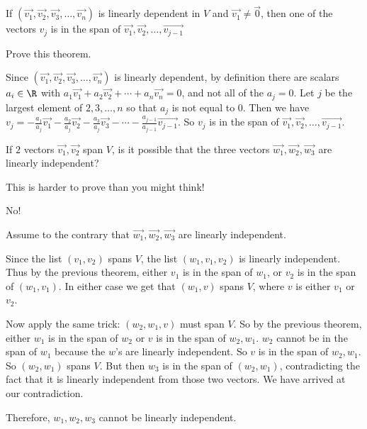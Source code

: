 \documentclass{ximera}
\begin{document}
 \begin{theorem}
 	If $(\vec{v_1},\vec{v_2},\vec{v_3}, \ldots, \vec{v_n})$ is linearly dependent in $V$ and $\vec{v_1} \neq \vec{0}$, then one of the vectors $v_j$ is in the 
 	span of $\vec{v_1},\vec{v_2},\ldots,\vec{v_{j-1}}$
 \end{theorem}
 
Prove this theorem.

\begin{free-response}
 	Since $(\vec{v_1},\vec{v_2},\vec{v_3}, \ldots, \vec{v_n})$ is linearly dependent, by definition there are scalars $a_i \in \R$ with 
 	$a_1\vec{v_1}+a_2\vec{v_2}+ \cdots +a_n\vec{v_n} = 0$, and not all of the $a_j =0$.  Let $j$ be the largest element of ${2,3,\ldots,n}$ so that $a_j$ is not equal to $0$.
 	Then we have 
 	$v_j = -\frac{a_1}{a_j}\vec{v_1}-\frac{a_2}{a_j}\vec{v_2} -\frac{a_3}{a_j}\vec{v_3} - \cdots -\frac{a_{j-1}}{a_{j-1}}\vec{v_{j-1}}$.
 	So $v_j$ is in the span of $\vec{v_1},\vec{v_2},\ldots,\vec{v_{j-1}}$.
 \end{free-response}
 
 
 	If $2$ vectors $\vec{v_1},\vec{v_2}$ span $V$, is it possible that the three vectors $\vec{w_1},\vec{w_2},\vec{w_3}$ are linearly independent?
 	
 	\begin{warning}
 		This is harder to prove than you might think!
 	\end{warning}
\begin{free-response}
	No!
	
	Assume to the contrary that $\vec{w_1},\vec{w_2},\vec{w_3}$ are linearly independent.
	
	Since the list $(v_1,v_2)$ spans $V$, the list $(w_1,v_1,v_2)$ is linearly independent.  Thus by the previous theorem, either $v_1$ is in the span of $w_1$,
	or $v_2$ is in the span of $(w_1,v_1)$.  In either case we get that $(w_1,v)$ spans $V$, where $v$ is either $v_1$ or $v_2$.
	
	Now apply the same trick:  $(w_2,w_1,v)$ must span $V$.  So by the previous theorem, either $w_1$ is in the span of $w_2$ or $v$ is in the span of $w_2,w_1$.  
	$w_2$ cannot be in the span of $w_1$ because the $w$'s are linearly independent.  So $v$ is in the span of $w_2,w_1$.  So $(w_2,w_1)$ spans $V$.  But then
	$w_3$ is in the span of $(w_2,w_1)$, contradicting the fact that it is linearly independent from those two vectors.  We have arrived at our contradiction.
	
	Therefore, $w_1,w_2,w_3$ cannot be linearly independent.
\end{free-response}
\end{document}
